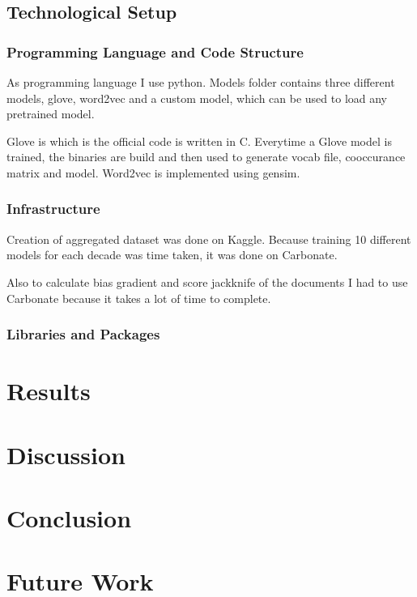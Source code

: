 \documentclass{article}
\begin{document}
\subsection{Technological Setup}

\subsubsection{Programming Language and Code Structure}

As programming language I use python. Models folder contains three different models, glove, word2vec and a custom model, which can be used to load any pretrained model.

Glove is which is the official code is written in C. Everytime a Glove model is trained, the binaries are build and then used to generate vocab file, cooccurance matrix and model. Word2vec is implemented using gensim.

\subsubsection{Infrastructure}

Creation of aggregated dataset was done on Kaggle. Because training 10 different models for each decade was time taken, it was done on Carbonate.

Also to calculate bias gradient and score jackknife  of the documents I had to use Carbonate because it takes a lot of time to complete.

\subsubsection{Libraries and Packages}



\section{Results}

\section{Discussion}

\section{Conclusion}

\section{Future Work}


\begin{acks}
\end{acks}






\end{document}
